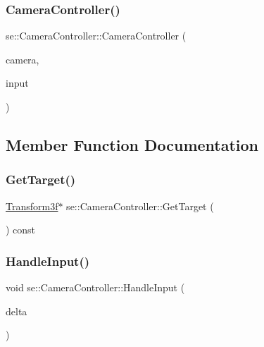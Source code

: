 \subsubsection{\texorpdfstring{Camera\+Controller()}{CameraController()}}
{\footnotesize\ttfamily se\+::\+Camera\+Controller\+::\+Camera\+Controller (\begin{DoxyParamCaption}\item[{\mbox{\hyperlink{classse_1_1_abstract_camera}{Abstract\+Camera}} $\ast$}]{camera,  }\item[{\mbox{\hyperlink{classse_1_1_input}{Input}} $\ast$}]{input }\end{DoxyParamCaption})}



\subsection{Member Function Documentation}
\mbox{\label{classse_1_1_camera_controller_a5b63115409d37fd1aa893e27bb2444a3}} 
\subsubsection{\texorpdfstring{Get\+Target()}{GetTarget()}}
{\footnotesize\ttfamily \mbox{\hyperlink{classse_1_1_transform3f}{Transform3f}}$\ast$ se\+::\+Camera\+Controller\+::\+Get\+Target (\begin{DoxyParamCaption}{ }\end{DoxyParamCaption}) const}

\mbox{\label{classse_1_1_camera_controller_ab6bbdc5adfe20a96d28a53258e5de1a6}} 
\subsubsection{\texorpdfstring{Handle\+Input()}{HandleInput()}}
{\footnotesize\ttfamily void se\+::\+Camera\+Controller\+::\+Handle\+Input (\begin{DoxyParamCaption}\item[{float}]{delta }\end{DoxyParamCaption})}


